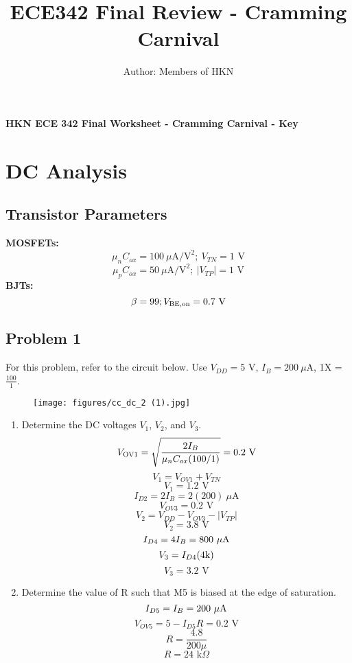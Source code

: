 \documentclass{article}
\title{ECE342 Final Review - Cramming Carnival}
\author{Author: Members of HKN}
\date{}
\begin{document}
\begin{center}
\textbf{
{\Large HKN ECE 342 Final Worksheet - Cramming Carnival - Key}
}
\end{center} 
\noindent\makebox[\linewidth]{\rule{\linewidth}{0.2pt}}
\section*{DC Analysis}
\subsection*{Transistor Parameters}
\textbf{MOSFETs:}
$$\mu_nC_{ox} = 100\:\mu \text{A/V}^2; \ V_{TN} = 1\text{ V}$$
$$\mu_pC_{ox} = 50\:\mu \text{A/V}^2; \ |V_{TP}| = 1\text{ V}$$
\textbf{BJTs:}
$$\beta = 99; V_{\rm BE, on} = 0.7\text{ V}$$
\subsection*{Problem 1}
For this problem, refer to the circuit below. Use $V_{DD} = 5$ V, $I_B = 200\ \mu$A, 1X = $\frac{100}{1}$.
\begin{figure}[!htb]
\begin{center}
    \texttt{[image: figures/cc\_dc\_2 (1).jpg]}
\end{center}
\end{figure}
\begin{enumerate}[label=\textbf{(\alph*)}]
    \item Determine the DC voltages $V_1$, $V_2$, and $V_3$.
$$V_{\rm OV1} = \sqrt{\frac{2I_{B}}{\mu_nC_{ox}(100/1)}} = 0.2\text{ V}$$
$$V_1 = V_{OV1} + V_{TN}$$
$$\boxed{V_1 = 1.2\text{ V}}$$
$$I_{D2} = 2I_B = 2(200)\ \mu\text{A}$$
$$V_{OV3} = 0.2 \text{ V}$$
$$V_2 = V_{DD} - V_{OV3} - |V_{TP}|$$
$$\boxed{V_2 = 3.8\text{ V}}$$
$$I_{D4} = 4I_B = 800\ \mu \rm A$$
$$V_{3} = I_{D4}(4\rm k)$$
$$\boxed{V_3 = 3.2\text{ V}}$$
\newpage
    \item Determine the value of R such that M5 is biased at the edge of saturation.
$$I_{D5} = I_B = 200\ \mu \rm A$$
$$V_{OV5} = 5 - I_{D5}R = 0.2\text{ V}$$
$$R = \frac{4.8}{200 \mu}$$
$$\boxed{R = 24 \text{ k} \Omega}$$
\end{enumerate}
\newpage
\end{document}
